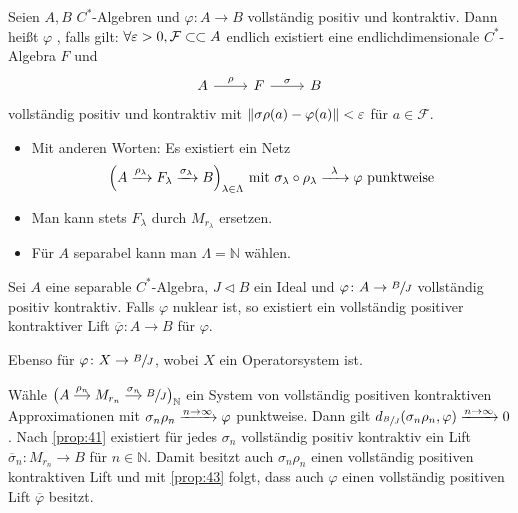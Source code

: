 \begin{definition}
	Seien $A,B$ $C^*$-Algebren und $\varphi \colon A \to B$ vollständig positiv und kontraktiv.
	Dann heißt $\varphi$ , falls gilt: 
	$\forall \varepsilon >0, \mathcal{F} \finSub A$ endlich existiert eine endlichdimensionale $C^*$-Algebra $F$ und 
	\[
		\begin{tikzcd}
			A \rar["\rho"] & F \rar["\sigma"] & B
		\end{tikzcd}
	\]
	vollständig positiv und kontraktiv mit $\norm*{\sigma \rho (a )- \varphi(a) } < \varepsilon$ für $a \in \mathcal{F}$.
	\begin{itemize}
		\item Mit anderen Worten: Es existiert ein Netz
		\[
			\enbrace*{A \xrightarrow{\rho_\lambda} F_\lambda \xrightarrow{\sigma_\lambda} B}_{\lambda \in \Lambda} \text{ mit } \sigma_\lambda \circ \rho_\lambda \grenzw{\lambda} \varphi \text{ punktweise}  
		\]
		\item Man kann stets $F_\lambda$ durch $M_{r_\lambda}$ ersetzen.
		\item Für $A$ separabel kann man $\Lambda = \mathbb{N}$ wählen.
	\end{itemize}
\end{definition}

\begin{satz}[{name={Choi-Effros}}]
	Sei $A$ eine separable $C^*$-Algebra, $J \lhd B$ ein Ideal und $\varphi\colon A \to \sfrac{B}{J}$ vollständig positiv kontraktiv.
	Falls $\varphi$ nuklear ist, so existiert ein vollständig positiver kontraktiver Lift $\overline{\varphi} \colon A \to B$ für $\varphi$.
	
	Ebenso für $\varphi \colon X \to \sfrac{B}{J}$, wobei $X$ ein Operatorsystem ist.
\end{satz}
\begin{beweis}
	Wähle $\big(\begin{tikzcd}[cramped,sep=small] A \rar["\rho_n"] & M_{r_n} \rar["\sigma_n"] & \sfrac{B}{J}\end{tikzcd}\big)_\mathbb{N}$ ein System von vollständig positiven kontraktiven Approximationen mit $\sigma_n \rho_n \grenzwIn{n \to \infty} \varphi$ punktweise.
	Dann gilt $d_{\sfrac{B}{J}}(\sigma_n \rho_n,\varphi) \grenzwIn{n \to \infty} 0$.
	Nach \autoref{prop:41} existiert für jedes $\sigma_n$ vollständig positiv kontraktiv ein Lift $\overline{\sigma}_n \colon M_{r_n} \to B$ für $n \in \mathbb{N}$.
	Damit besitzt auch $\sigma_n \rho_n$ einen vollständig positiven kontraktiven Lift und mit \autoref{prop:43} folgt, dass auch $\varphi$ einen vollständig positiven Lift $\overline{\varphi}$ besitzt.
\end{beweis}

